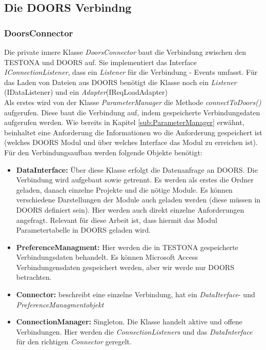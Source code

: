 \subsection{Die DOORS Verbindng}\label{sub.DoorsConn}
\subsubsection{DoorsConnector}


Die private innere Klasse \textit{DoorsConnector} baut die Verbindung zwischen den TESTONA und DOORS auf. Sie implementiert das Interface \textit{IConnectionListener}, dass ein \textit{Listener} für die Verbindung - Events umfasst. Für das Laden von Dateien aus DOORS benötigt die Klasse noch ein \textit{Listener} (IDataListener) und ein \textit{Adapter}(IReqLoadAdapter) \\

Als erstes wird von der Klasse \textit{ParameterManager} die Methode \textit{connectToDoors()} aufgerufen. Diese baut die Verbindung auf, indem gespeicherte Verbindungsdaten aufgerufen werden. Wie bereits in Kapitel \ref{sub:ParameterManager} erwähnt, beinhaltet eine Anforderung die Informationen wo die Anforderung gespeichert ist (welches DOORS Modul und über welches Interface das Modul zu erreichen ist). Für den Verbindungsaufbau werden folgende Objekte benötigt:

\begin{itemize}
\item \textbf{DataInterface: }Über diese Klasse erfolgt die Datenanfrage an DOORS. Die Verbindung wird aufgebaut sowie getrennt. Es werden als erstes die Ordner geladen, danach einzelne Projekte und die nötige Module. Es können verschiedene Darstellungen der Module auch geladen werden (diese müssen in DOORS definiert sein). Hier werden auch direkt einzelne Anforderungen angefragt. Relevant für diese Arbeit ist, dass hiermit das Modul Parametertabelle in DOORS geladen wird.

\item \textbf{PreferenceManagment: } Hier werden die in TESTONA gespeicherte Verbindungsdaten behandelt. Es können Microsoft Access Verbindungensdaten gespeichert werden, aber wir werde nur DOORS betrachten.

\item \textbf{Connector: }beschreibt eine einzelne Verbindung, hat ein \textit{DataIterface}- und \textit{PreferenceManagmentobjekt}

\item \textbf{ConnectionManager: }Singleton. Die Klasse handelt aktive und offene Verbindungen. Hier werden die \textit{ConnectionListeners} und das \textit{DataInterface} für den richtigen \textit{Connector} geregelt.

\end{itemize}


